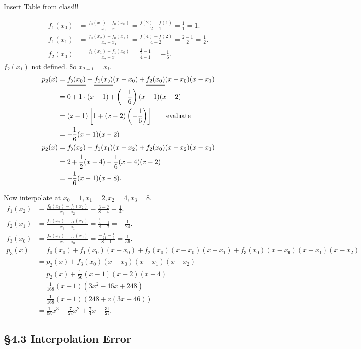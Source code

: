 \documentclass[]{article}
\begin{document}
	Insert Table from class!!!

	\begin{align*}
		f_1(x_0) &= \frac{f_0(x_1)-f_0(x_0)}{x_1-x_0} = \frac{f(2)-f(1)}{2-1} = \frac11 = 1. \\
		f_1(x_1) &= \frac{f_0(x_2)-f_0(x_1)}{x_2-x_1} = \frac{f(4)-f(2)}{4-2} = \frac{2-1}2 = \frac12. \\
		f_2(x_0) &= \frac{f_1(x_1)-f_1(x_0)}{x_2-x_0} = \frac{\frac12-1}{4-1} =-\frac16.
	\end{align*}
	$f_2(x_1)$ not defined. So $x_{2+1}=x_3$.
	\begin{align*}
		p_2(x) &= \underline{\underline{f_0(x_0)}} + \underline{\underline{f_1(x_0)}}(x-x_0) + \underline{\underline{f_2(x_0)}}(x-x_0)(x-x_1) \\
			   &= 0 + 1\cdot(x-1)+ \left(-\frac16\right)(x-1)(x-2) \\
			   &= (x-1)\left[1+(x-2)\left(-\frac16\right)\right] \qquad \text{evaluate} \\
			   &= -\frac16(x-1)(x-2) \\
		p_2(x) &= f_0(x_2) + f_1(x_1)(x-x_2) + f_2(x_0)(x-x_2)(x-x_1) \\
			   &= 2 + \frac12(x-4) - \frac16(x-4)(x-2) \\
			   &= -\frac16(x-1)(x-8).
	\end{align*}
\begin{example}
	[continued] Now interpolate at $x_0=1,x_1=2,x_2=4,x_3=8$.
	\begin{align*}
		f_1(x_2) &= \frac{f_0(x_3)-f_0(x_2)}{x_3-x_2} = \frac{3-2}{8-4} = \frac14. \\
		f_2(x_1) &= \frac{f_1(x_2)-f_1(x_1)}{x_3-x_1} = \frac{\frac14-\frac12}{8-2} = -\frac1{24}. \\
		f_3(x_0) &= \frac{f_2(x_1)-f_2(x_0)}{x_3-x_0} = \frac{-\frac1{24}+\frac16}{8-1} = \frac1{56}. \\
		p_3(x) &= f_0(x_0) + f_1(x_0)(x-x_0) + f_2(x_0)(x-x_0)(x-x_1) + f_3(x_0)(x-x_0)(x-x_1)(x-x_2) \\
			   &= p_2(x) + f_3(x_0)(x-x_0)(x-x_1)(x-x_2) \\
			   &= p_2(x) + \frac1{56}(x-1)(x-2)(x-4) \\
			   &= \frac1{168}(x-1)(3x^2-46x+248) \\
			   &= \frac1{168}(x-1)(248+x(3x-46)) \\
			   &= \frac1{56}x^3 - \frac7{24}x^2 + \frac74x - \frac{31}{21}.
	\end{align*}
\end{example}

\subsection*{\S4.3 Interpolation Error}
\end{document}
